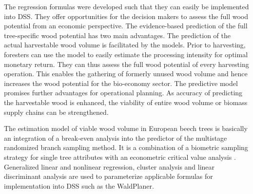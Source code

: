 The regression formulas were developed such that they can easily be implemented into DSS. They offer opportunities for the decision makers to assess the full wood potential from an economic perspective. The evidence-based prediction of the full tree-specific wood potential has two main advantages. The prediction of the actual harvestable wood volume is facilitated by the models. Prior to harvesting, foresters can use the model to easily estimate the processing intensity for optimal monetary return. They can thus assess the full wood potential of every harvesting operation. This enables the gathering of formerly unused wood volume and hence increases the wood potential for the bio-economy sector. The predictive model promises further advantages for operational planning. As accuracy of predicting the harvestable wood is enhanced, the viability of entire wood volume or biomass supply chains can be strengthened.

The estimation model of viable wood volume in European beech trees is basically an integration of a break-even analysis into the predictor of the multistage randomized branch sampling method. It is a combination of a biometric sampling strategy for single tree attributes \citep[p. 405]{Gregoire_2008} with an econometric critical value analysis \citep[p. 46]{mushoff_2013}. Generalized linear and nonlinear regression, cluster analysis and linear discriminant analysis are used to parameterize applicable formulas for implementation into DSS such as the WaldPlaner.

